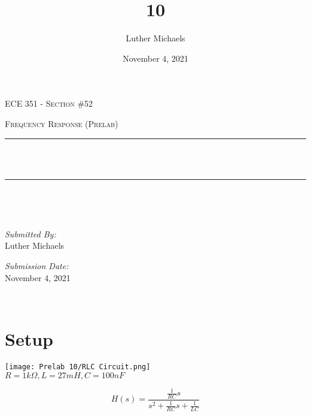 \documentclass[12pt]{report}
\title{10}	%
\author{Luther Michaels}	%
\date{November 4, 2021}   %
\makeatletter
\let\thetitle\@title
\makeatother
\begin{document}
	
\begin{titlepage}
	\centering
	\vspace*{0.5 cm}
		
	\begin{center}    
		\textsc{\Large   ECE 351 - Section \#52}\\[2.0 cm]	
	\end{center}  
	\textsc{\Large Frequency Response (Prelab)  }\\[0.5 cm]
	\rule{\linewidth}{0.2 mm} \\[0.4 cm]
	{ \huge \bfseries \thetitle}\\
	\rule{\linewidth}{0.2 mm} \\[1.5 cm]
	\begin{minipage}{0.4\textwidth}
		\begin{flushleft} \large
		\end{flushleft}
	\end{minipage}~
	\begin{minipage}{0.4\textwidth}
		\begin{flushright} \large
			\emph{Submitted By:} \\
			Luther Michaels \break
				
			\emph{Submission Date:} \\
			November 4, 2021
		\end{flushright}
	\end{minipage}\\[2 cm]
\end{titlepage}
	
\renewcommand{\thesection}{\arabic{section}}
	
\section{Setup}
	
\begin{center}
	\texttt{[image: Prelab 10/RLC Circuit.png]}\\[1.0 cm]
	$ R = 1 k\Omega, L = 27 mH, C = 100 nF $
\end{center}
\begin{equation*}
	H(s) = \frac{\frac{1}{RC}s}{s^2 + \frac{1}{RC}s + \frac{1}{LC}}
\end{equation*} \\
	
\end{document}
